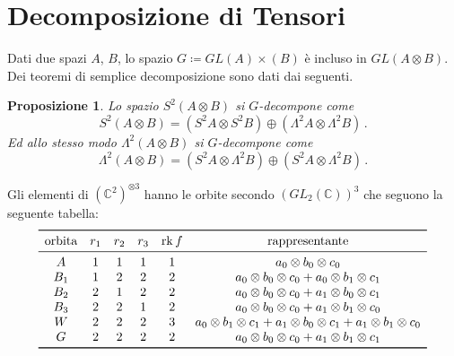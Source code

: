 \documentclass[a4paper, 11pt]{article}
\theoremstyle{definition}
\theoremstyle{plain}
\newtheorem{Prop}[Def]{Proposizione}
\newcommand{\C}{\mathbb{C}}
\newcommand{\deff}{\coloneqq}
\DeclareMathOperator{\rk}{rk}
\begin{document}
\section{Decomposizione di Tensori}

Dati due spazi $A$, $B$, lo spazio $G \deff GL(A) \times (B)$ è incluso in $GL(A\otimes B)$. Dei teoremi di semplice decomposizione sono dati dai seguenti.
\begin{Prop}
	Lo spazio $S^2(A\otimes B)$ si $G$-decompone come
	\[
		S^2(A \otimes B) = (S^2A \otimes S^2B) \oplus (\Lambda^2A \otimes \Lambda^2B)\,.
	\]
	Ed allo stesso modo $\Lambda^2(A\otimes B)$ si $G$-decompone come
	\[
		\Lambda^2(A\otimes B) = (S^2A \otimes \Lambda^2B) \oplus (S^2A \otimes \Lambda^2B)\,.
	\]
\end{Prop} 

Gli elementi di $(\C^2)^{\otimes 3}$ hanno le orbite secondo $(GL_2(\C))^3$ che seguono la seguente tabella:
\[
\begin{array}{cccccc}
	\toprule
	\text{orbita} & r_1 & r_2 & r_3 &  \rk f & \text{rappresentante}\\
	\midrule
	A & 1 & 1 & 1 & 1 & a_0\otimes b_0 \otimes c_0 \\
	B_1 & 1 & 2 & 2 & 2 & a_0\otimes b_0 \otimes c_0 + a_0\otimes b_1 \otimes c_1\\
	B_2 & 2 & 1 & 2 & 2 & a_0\otimes b_0 \otimes c_0 + a_1\otimes b_0 \otimes c_1\\
	B_3 & 2 & 2 & 1 & 2 & a_0\otimes b_0 \otimes c_0 + a_1\otimes b_1 \otimes c_0\\
	W & 2 & 2 & 2 & 3 & a_0\otimes b_1 \otimes c_1 + a_1\otimes b_0 \otimes c_1 + a_1\otimes b_1 \otimes c_0\\
	G & 2 & 2 & 2 & 2 & a_0\otimes b_0 \otimes c_0 + a_1\otimes b_1 \otimes c_1 \\
	\bottomrule
\end{array}
\]
\printbibliography
\end{document}
